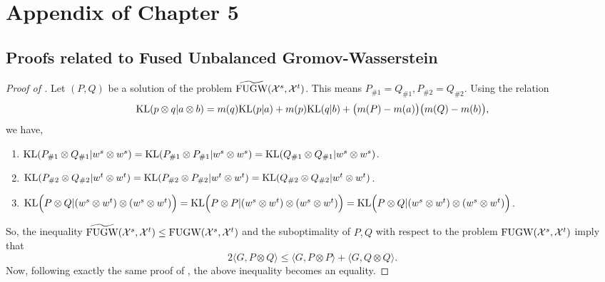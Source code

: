 \section{Appendix of Chapter 5}

\subsection{Proofs related to Fused Unbalanced Gromov-Wasserstein}

\begin{proof}[Proof of ]
  Let $(P, Q)$ be a solution of the problem $\widetilde{\text{FUGW}}(\mathcal X^s, \mathcal X^t)$.
  This means $P_{\#1} = Q_{\#1}, P_{\#2} = Q_{\#2}$. Using the relation
  \begin{align}
    \text{KL}(p \otimes q | a \otimes b) = m(q) \text{KL}(p | a) + m(p) \text{KL}(q | b)
    + \big(m(P) - m(a)\big) \big(m(Q) - m(b)\big),
  \end{align}
  we have,
  \begin{enumerate}
    \item $\text{KL}(P_{\#1} \otimes Q_{\#1} \vert w^s \otimes w^s) =
    \text{KL}(P_{\#1} \otimes P_{\#1} \vert w^s \otimes w^s) =
    \text{KL}(Q_{\#1} \otimes Q_{\#1} \vert w^s \otimes w^s)$.

    \item $\text{KL}(P_{\#2} \otimes Q_{\#2} \vert w^t \otimes w^t) =
  \text{KL}(P_{\#2} \otimes P_{\#2} \vert w^t \otimes w^t) =
  \text{KL}(Q_{\#2} \otimes Q_{\#2} \vert w^t \otimes w^t)$.

    \item $\text{KL} \Big(P \otimes Q | (w^s \otimes w^t) \otimes (w^s \otimes w^t) \Big) =
    \text{KL} \Big(P \otimes P | (w^s \otimes w^t) \otimes (w^s \otimes w^t) \Big)
    = \text{KL} \Big(P \otimes Q | (w^s \otimes w^t) \otimes (w^s \otimes w^t) \Big)$.
  \end{enumerate}
  So, the inequality $\widetilde{\text{FUGW}}(\mathcal X^s, \mathcal X^t) \leq \text{FUGW}(\mathcal X^s, \mathcal X^t)$ and
  the suboptimality of $P, Q$ with respect to the problem $\text{FUGW}(\mathcal X^s, \mathcal X^t)$ imply that
  \begin{equation}
    2 \langle G, P \otimes Q \rangle \leq
      \langle G, P \otimes P \rangle + \langle G, Q \otimes Q \rangle.
  \end{equation}
  Now, following exactly the same proof of ,
  the above inequality becomes an equality.
\end{proof}